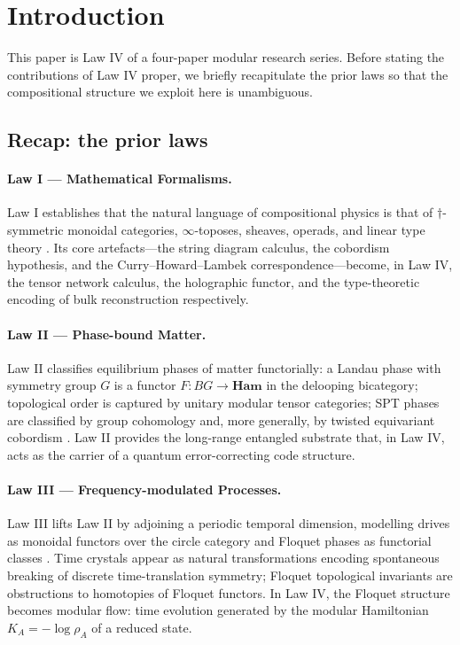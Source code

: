 \documentclass[12pt]{article}
\theoremstyle{definition}
\theoremstyle{remark}
\newcommand{\Ham}{\mathbf{Ham}}
\begin{document}
\tableofcontents

\section{Introduction}
\label{sec:intro}

This paper is Law IV of a four-paper modular research series. Before stating the contributions of Law IV proper, we briefly recapitulate the prior laws so that the compositional structure we exploit here is unambiguous.

\subsection{Recap: the prior laws}
\label{sec:recap}

\paragraph{Law I --- Mathematical Formalisms.}
Law I establishes that the natural language of compositional physics is that of $\dagger$-symmetric monoidal categories, $\infty$-toposes, sheaves, operads, and linear type theory \cite{atiyah1988,baezdolan1995,baezstay2009,abramskycoecke2004,lurie2009,schreibershulman2014,lawvere1963}. Its core artefacts---the string diagram calculus, the cobordism hypothesis, and the Curry--Howard--Lambek correspondence---become, in Law IV, the tensor network calculus, the holographic functor, and the type-theoretic encoding of bulk reconstruction respectively.

\paragraph{Law II --- Phase-bound Matter.}
Law II classifies equilibrium phases of matter functorially: a Landau phase with symmetry group $G$ is a functor $F\colon BG \to \Ham$ in the delooping bicategory; topological order is captured by unitary modular tensor categories; SPT phases are classified by group cohomology and, more generally, by twisted equivariant cobordism \cite{kitaev2003,wen1990,levinwen2005,chen2013,kitaevpreskill2006}. Law II provides the long-range entangled substrate that, in Law IV, acts as the carrier of a quantum error-correcting code structure.

\paragraph{Law III --- Frequency-modulated Processes.}
Law III lifts Law II by adjoining a periodic temporal dimension, modelling drives as monoidal functors over the circle category and Floquet phases as functorial classes \cite{else2016,khemani2016,bukov2015,rudner2020,roy2017}. Time crystals appear as natural transformations encoding spontaneous breaking of discrete time-translation symmetry; Floquet topological invariants are obstructions to homotopies of Floquet functors. In Law IV, the Floquet structure becomes modular flow: time evolution generated by the modular Hamiltonian $K_A = -\log\rho_A$ of a reduced state.
\end{document}
